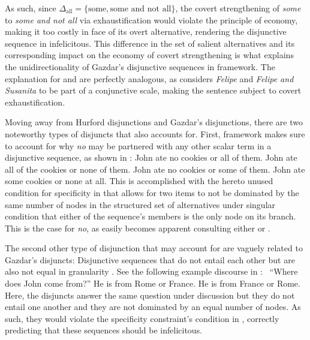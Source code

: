 \noindent As such, since $\Delta_\text{all}=\{\text{some},\text{some and not all}\}$, the covert strengthening of \textit{some} to \textit{some and not all} via exhaustification would violate the principle of economy, making it too costly in face of its overt alternative, rendering the disjunctive sequence in  infelicitous. This difference in the set of salient alternatives and its corresponding impact on the economy of covert strengthening is what explains the unidirectionality of Gazdar's disjunctive sequences in  framework. The explanation for  and  are perfectly analogous, as \textcite{Ippolito2020} considers \textit{Felipe} and \textit{Felipe and Susanita} to be part of a conjunctive scale, making the sentence subject to covert exhaustification.

Moving away from Hurford disjunctions and Gazdar's disjunctions, there are two noteworthy types of disjuncts that \textcite{Ippolito2020} also accounts for. First,  framework makes sure to account for why \textit{no} may be partnered with any other scalar term in a disjunctive sequence, as shown in :
\pex[nopreamble=true]\label{ex:ippolito-showoff}%
\a{} John ate no cookies or all of them.
\a{} John ate all of the cookies or none of them.
\a{} John ate no cookies or some of them.
\a{} John ate some cookies or none at all.
\xe
This is accomplished with the hereto unused condition for specificity in  that allows for two items to not be dominated by the same number of nodes in the structured set of alternatives under singular condition that either of the sequence's members is the only node on its branch. This is the case for \textit{no}, as easily becomes apparent consulting either  or .

The second other type of disjunction that \textcite{Ippolito2020} may account for are vaguely related to Gazdar's disjuncts: Disjunctive sequences that do not entail each other but are also not equal in granularity \parencite[p.~648, Footnote~12]{Ippolito2020}. See the following example discourse in :
\pex{}\label{ex:ippolito-showoff2}%
~\enquote{Where does John come from?}
\a{} {}He is from Rome or France.
\a{} {}He is from France or Rome.
\xe
Here, the disjuncts answer the same question under discussion but they do not entail one another and they are not dominated by an equal number of nodes. As such, they would violate the specificity constraint's condition in , correctly predicting that these sequences should be infelicitous.

